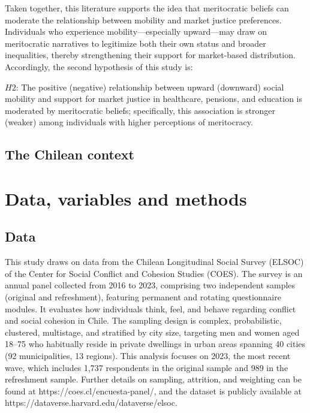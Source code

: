 \documentclass[
  12pt,
]{article}
\begin{document}
Taken together, this literature supports the idea that meritocratic
beliefs can moderate the relationship between mobility and market
justice preferences. Individuals who experience mobility---especially
upward---may draw on meritocratic narratives to legitimize both their
own status and broader inequalities, thereby strengthening their support
for market-based distribution. Accordingly, the second hypothesis of
this study is:

\(H2\): The positive (negative) relationship between upward (downward)
social mobility and support for market justice in healthcare, pensions,
and education is moderated by meritocratic beliefs; specifically, this
association is stronger (weaker) among individuals with higher
perceptions of meritocracy.

\subsection{The Chilean context}\label{the-chilean-context}

\section{Data, variables and methods}\label{data-variables-and-methods}

\subsection{Data}\label{data}

This study draws on data from the Chilean Longitudinal Social Survey
(ELSOC) of the Center for Social Conflict and Cohesion Studies (COES).
The survey is an annual panel collected from 2016 to 2023, comprising
two independent samples (original and refreshment), featuring permanent
and rotating questionnaire modules. It evaluates how individuals think,
feel, and behave regarding conflict and social cohesion in Chile. The
sampling design is complex, probabilistic, clustered, multistage, and
stratified by city size, targeting men and women aged 18--75 who
habitually reside in private dwellings in urban areas spanning 40 cities
(92 municipalities, 13 regions). This analysis focuses on 2023, the most
recent wave, which includes 1,737 respondents in the original sample and
989 in the refreshment sample. Further details on sampling, attrition,
and weighting can be found at https://coes.cl/encuesta-panel/, and the
dataset is publicly available at
https://dataverse.harvard.edu/dataverse/elsoc.
\end{document}
